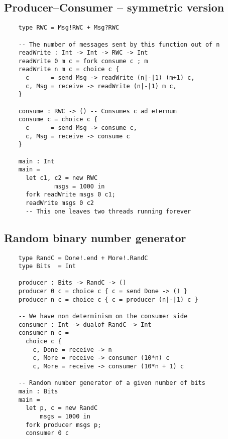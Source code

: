 \documentclass{article}
\begin{document}
  \subsection{Producer--Consumer -- symmetric version}
    \vspace{2cm}
\begin{lstlisting}
    type RWC = Msg!RWC + Msg?RWC
  
    -- The number of messages sent by this function out of n
    readWrite : Int -> Int -> RWC -> Int
    readWrite 0 m c = fork consume c ; m
    readWrite n m c = choice c {
      c      = send Msg -> readWrite (n|-|1) (m+1) c,
      c, Msg = receive -> readWrite (n|-|1) m c,
    }

    consume : RWC -> () -- Consumes c ad eternum
    consume c = choice c {
      c      = send Msg -> consume c,
      c, Msg = receive -> consume c
    }

    main : Int
    main =
      let c1, c2 = new RWC
              msgs = 1000 in
      fork readWrite msgs 0 c1;
      readWrite msgs 0 c2
      -- This one leaves two threads running forever
  \end{lstlisting}
  \newpage
  \subsection{Random binary number generator}
  \vspace{2cm}
  \begin{lstlisting}
    type RandC = Done!.end + More!.RandC
    type Bits  = Int

    producer : Bits -> RandC -> ()
    producer 0 c = choice c { c = send Done -> () }
    producer n c = choice c { c = producer (n|-|1) c }

    -- We have non determinism on the consumer side
    consumer : Int -> dualof RandC -> Int
    consumer n c =
      choice c {
        c, Done = receive -> n    
        c, More = receive -> consumer (10*n) c    
        c, More = receive -> consumer (10*n + 1) c    

    -- Random number generator of a given number of bits
    main : Bits
    main =
      let p, c = new RandC
          msgs = 1000 in
      fork producer msgs p;
      consumer 0 c
  \end{lstlisting}
\end{document}
